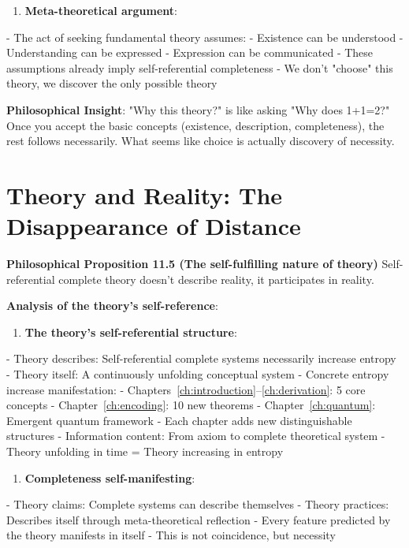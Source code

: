 \begin{enumerate}
\item \textbf{Meta-theoretical argument}:
\end{enumerate}
   - The act of seeking fundamental theory assumes:
     - Existence can be understood
     - Understanding can be expressed
     - Expression can be communicated
   - These assumptions already imply self-referential completeness
   - We don't "choose" this theory, we discover the only possible theory

\textbf{Philosophical Insight}:
"Why this theory?" is like asking "Why does 1+1=2?"
Once you accept the basic concepts (existence, description, completeness),
the rest follows necessarily. What seems like choice is actually discovery of necessity.

\section{Theory and Reality: The Disappearance of Distance}
\label{sec:ch11_philosophy:theory-and-reality-the-disappearance-of-distance}

\textbf{Philosophical Proposition 11.5 (The self-fulfilling nature of theory)}
Self-referential complete theory doesn't describe reality, it participates in reality.

\textbf{Analysis of the theory's self-reference}:

\begin{enumerate}
\item \textbf{The theory's self-referential structure}:
\end{enumerate}
   - Theory describes: Self-referential complete systems necessarily increase entropy
   - Theory itself: A continuously unfolding conceptual system
   - Concrete entropy increase manifestation:
     - Chapters~\ref{ch:introduction}--\ref{ch:derivation}: 5 core concepts
     - Chapter~\ref{ch:encoding}: 10 new theorems
     - Chapter~\ref{ch:quantum}: Emergent quantum framework
     - Each chapter adds new distinguishable structures
   - Information content: From axiom to complete theoretical system
   - Theory unfolding in time = Theory increasing in entropy

\begin{enumerate}
\item \textbf{Completeness self-manifesting}:
\end{enumerate}
   - Theory claims: Complete systems can describe themselves
   - Theory practices: Describes itself through meta-theoretical reflection
   - Every feature predicted by the theory manifests in itself
   - This is not coincidence, but necessity

